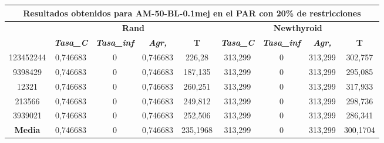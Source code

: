 \documentclass[12pt, spanish]{article}
\begin{document}
\begin{table}[H]
\footnotesize
\begin{tabular}{|c|c|c|c|c|c|c|c|c|}
\hline
\multicolumn{9}{|c|}{\textbf{Resultados obtenidos para AM-50-BL-0.1mej en el PAR con 20\% de restricciones}}                                                                                                      \\ \hline
\multirow{2}{*}{} & \multicolumn{4}{c|}{\textbf{Rand}}                                                            & \multicolumn{4}{c|}{\textbf{Newthyroid}}                                                      \\ \cline{2-9} 
                  & \textit{\textbf{Tasa\_C}} & \textit{\textbf{Tasa\_inf}} & \textit{\textbf{Agr,}} & \textbf{T} & \textit{\textbf{Tasa\_C}} & \textit{\textbf{Tasa\_inf}} & \textit{\textbf{Agr,}} & \textbf{T} \\ \hline
123452244         & 0,746683                  & 0                           & 0,746683               & 226,28     & 313,299                   & 0                           & 313,299                & 302,757    \\ \hline
9398429           & 0,746683                  & 0                           & 0,746683               & 187,135    & 313,299                   & 0                           & 313,299                & 295,085    \\ \hline
12321             & 0,746683                  & 0                           & 0,746683               & 260,251    & 313,299                   & 0                           & 313,299                & 317,933    \\ \hline
213566            & 0,746683                  & 0                           & 0,746683               & 249,812    & 313,299                   & 0                           & 313,299                & 298,736    \\ \hline
3939021           & 0,746683                  & 0                           & 0,746683               & 252,506    & 313,299                   & 0                           & 313,299                & 286,341    \\ \hline
\textbf{Media}    & 0,746683                  & 0                           & 0,746683               & 235,1968   & 313,299                   & 0                           & 313,299                & 300,1704   \\ \hline
\end{tabular}
\end{table}
\end{document}
